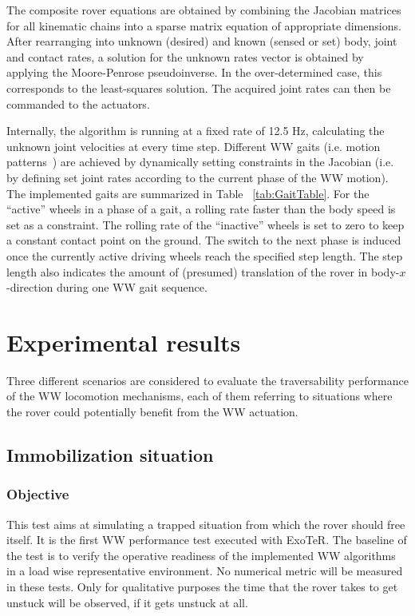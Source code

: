 \documentclass[a4paper,twocolumn]{esapub2005} %
\begin{document}
The composite rover equations are obtained by combining the Jacobian
matrices for all kinematic chains into a sparse matrix equation of appropriate
dimensions. After rearranging into unknown (desired) and known (sensed or set) 
body, joint and contact rates, a solution for the unknown rates vector is 
obtained by applying the Moore-Penrose pseudoinverse. In the over-determined 
case, this corresponds to the least-squares solution. The acquired joint rates 
can then be commanded to the actuators.

Internally, the algorithm is running at a fixed rate of 12.5 Hz, calculating 
the unknown joint velocities at every time step. Different WW gaits (i.e. 
motion patterns~\cite{LucWalkingGaits}) are achieved by dynamically setting 
constraints in the Jacobian (i.e. by defining set joint rates according to the 
current phase of the WW motion). The implemented gaits are summarized in Table 
~\ref{tab:GaitTable}. For the ``active'' wheels in a phase of a gait, a rolling 
rate faster than the body speed is set as a constraint. The rolling rate of the 
``inactive'' wheels is set to zero to keep a constant contact point on the 
ground. The switch to the next phase is induced once the currently active 
driving wheels reach the specified step length. The step length also indicates 
the amount of (presumed) translation of the rover in body-$x$-direction during 
one WW gait sequence.


\section{Experimental results}

Three different scenarios are considered to evaluate the traversability
performance of the WW locomotion mechanisms, each of them referring
to situations where the rover could potentially benefit from the WW
actuation.

\subsection{Immobilization situation} 

\subsubsection{Objective} This test aims at simulating a trapped situation
from which the rover should free itself. It is the first WW
performance test executed with ExoTeR. The baseline of the test is to verify
the operative readiness of the implemented WW algorithms in a load
wise representative environment.
No numerical metric will be measured in these tests. Only for qualitative purposes the time that the rover takes to get unstuck will be observed, if it gets unstuck at all.
\end{document}
